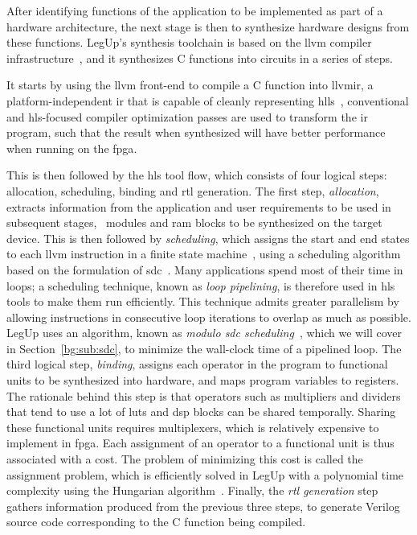 After identifying functions of the application to be implemented as part of a
hardware architecture, the next stage is then to synthesize hardware designs
from these functions.  LegUp's synthesis toolchain is based on the \gls{llvm}
compiler infrastructure~\cite{llvm}, and it synthesizes C functions into
circuits in a series of steps.

It starts by using the \gls{llvm} front-end to compile a C function into
\gls{llvmir}, a platform-independent \gls{ir} that is capable of cleanly
representing \glspl{hll}~\cite{llvm_ir}, conventional and \gls{hls}-focused
compiler optimization passes are used to transform the \gls{ir} program, such
that the result when synthesized will have better performance when running on
the \gls{fpga}\@.

This is then followed by the \gls{hls} tool flow, which consists of four
logical steps: allocation, scheduling, binding and \gls{rtl} generation.  The
first step, \emph{allocation}, extracts information from the application
and user requirements to be used in subsequent stages, \eg~modules and
\gls{ram} blocks to be synthesized on the target device.  This is then
followed by \emph{scheduling}, which assigns the start and end states to
each \gls{llvm} instruction in a finite state machine~\cite{legup}, using
a scheduling algorithm based on the formulation of \gls{sdc}~\cite{legup,
canis13, cong06}.  Many applications spend most of their time in loops; a
scheduling technique, known as \emph{loop pipelining}, is therefore used in
\gls{hls} tools to make them run efficiently.  This technique admits greater
parallelism by allowing instructions in consecutive loop iterations to overlap
as much as possible.  LegUp uses an algorithm, known as \emph{modulo \gls{sdc}
scheduling}~\cite{canis14}, which we will cover in Section~\ref{bg:sub:sdc},
to minimize the wall-clock time of a pipelined loop.  The third logical step,
\emph{binding}, assigns each operator in the program to functional units
to be synthesized into hardware, and maps program variables to registers.
The rationale behind this step is that operators such as multipliers and
dividers that tend to use a lot of \glspl{lut} and \gls{dsp} blocks can be
shared temporally.  Sharing these functional units requires multiplexers,
which is relatively expensive to implement in \gls{fpga}\@.  Each assignment
of an operator to a functional unit is thus associated with a cost.  The
problem of minimizing this cost is called the assignment problem, which is
efficiently solved in LegUp with a polynomial time complexity using the
Hungarian algorithm~\cite{canis13, kuhn10}.  Finally, the \emph{\gls{rtl}
generation} step gathers information produced from the previous three steps, to
generate Verilog source code corresponding to the C function being compiled.

